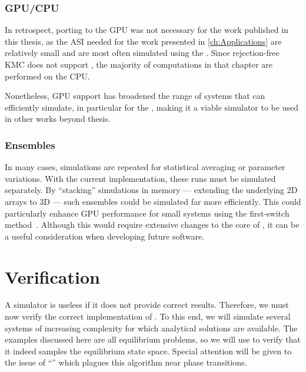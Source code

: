 \subsubsection{GPU/CPU}
In retrospect, porting \hotspice to the GPU was not necessary for the work published in this thesis, as the ASI needed for the work presented in \cref{ch:Applications} are relatively small and are most often simulated using the .
Since rejection-free KMC does not support , the majority of computations in that chapter are performed on the CPU. \par
Nonetheless, GPU support has broadened the range of systems that \hotspice can efficiently simulate, in particular for the , making it a viable simulator to be used in other works beyond thesis.

\subsubsection{Ensembles}
In many cases, simulations are repeated for statistical averaging or parameter variations.
With the current \hotspice implementation, these runs must be simulated separately.
By ``stacking'' simulations in memory --- extending the underlying 2D arrays to 3D --- such ensembles could be simulated far more efficiently.
This could particularly enhance GPU performance for small systems using the first-switch method~\cite{GillespieParallel}.
Although this would require extensive changes to the core of \hotspice, it can be a useful consideration when developing future software.

\newpage %
\section{Verification} \label{sec:2:Verification}
A simulator is useless if it does not provide correct results.
Therefore, we must now verify the correct implementation of \hotspice.
To this end, we will simulate several systems of increasing complexity for which analytical solutions are available.
The examples discussed here are all equilibrium problems, so we will use  to verify that it indeed samples the equilibrium state space.
Special attention will be given to the issue of ``'' which plagues this algorithm near phase transitions.

